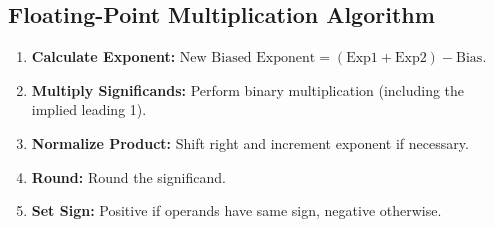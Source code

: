 \medskip

\subsection{Floating-Point Multiplication Algorithm}

\begin{proposition}

\begin{enumerate}
    \item \textbf{Calculate Exponent:} $\text{New Biased Exponent} = (\text{Exp1} + \text{Exp2}) - \text{Bias}$.
    \item \textbf{Multiply Significands:} Perform binary multiplication (including the implied leading 1).
    \item \textbf{Normalize Product:} Shift right and increment exponent if necessary.
    \item \textbf{Round:} Round the significand.
    \item \textbf{Set Sign:} Positive if operands have same sign, negative otherwise.
\end{enumerate}

\end{proposition}
